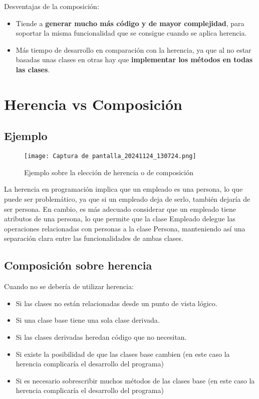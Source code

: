 \documentclass{article}
\begin{document}
Desventajas de la composición:
\begin{itemize}
    \item Tiende a \textbf{generar mucho más código y de mayor complejidad}, para soportar la misma funcionalidad que se consigue cuando se aplica herencia.
    \item Más tiempo de desarrollo en comparación con la herencia, ya que al no estar basadas unas clases en otras hay que \textbf{implementar los métodos en todas las clases}.
\end{itemize}

\newpage

\section{Herencia vs Composición}

\subsection{Ejemplo}

\begin{figure}[h]
    \centering
    \texttt{[image: Captura de pantalla\_20241124\_130724.png]}
    \caption{Ejemplo sobre la elección de herencia o de composición}
\end{figure}

La herencia en programación implica que un empleado es una persona, lo que puede ser problemático, ya que si un empleado deja de serlo, también dejaría de ser persona. En cambio, es más adecuado considerar que un empleado tiene atributos de una persona, lo que permite que la clase Empleado delegue las operaciones relacionadas con personas a la clase Persona, manteniendo así una separación clara entre las funcionalidades de ambas clases.

\subsection{Composición sobre herencia}

Cuando no se debería de utilizar herencia:
\begin{itemize}
    \item Si las clases no están relacionadas desde un punto de vista lógico.
    \item Si una clase base tiene una sola clase derivada.
    \item Si las clases derivadas heredan código que no necesitan.
    \item Si existe la posibilidad de que las clases base cambien (en este caso la herencia complicaría el desarrollo del programa)
    \item Si es necesario sobrescribir muchos métodos de las clases base (en este caso la herencia complicaría el desarrollo del programa)
\end{itemize}
\end{document}
